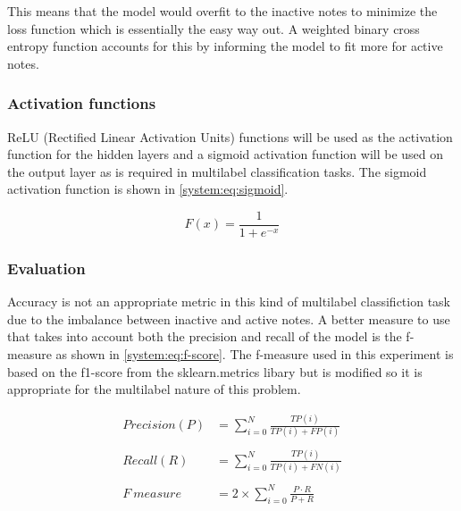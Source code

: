 This means that the model would overfit to the inactive notes to minimize the loss function which is essentially
the easy way out. A weighted binary cross entropy function accounts for this by
informing the model to fit more for active notes.

\subsubsection{Activation functions}

ReLU (Rectified Linear Activation Units) functions will be used as the
activation function for the hidden layers and a sigmoid activation function will
be used on the output layer as is required in multilabel classification tasks. The sigmoid
activation function is shown in \autoref{system:eq:sigmoid}.

\begin{equation}
    F (x) = \frac{1}{1+ e^{-x}}
    \label{system:eq:sigmoid}
\end{equation}

\subsubsection{Evaluation}
Accuracy is not an appropriate metric in this kind of multilabel classifiction task due to the
imbalance between inactive and active notes. A better measure to use that takes into account both the
precision and recall of the model is the f-measure as shown in \autoref{system:eq:f-score}. The f-measure used in this experiment is based on the
f1-score from the sklearn.metrics libary but is modified so it is appropriate for the
multilabel nature of this problem.

\begin{equation}
    \begin{aligned}
        Precision(P) & = \sum_{i=0}^{N}\frac{TP(i)}{TP(i) + FP(i)}   \\ \\
        Recall(R)    & = \sum_{i=0}^{N}\frac{TP(i)}{TP(i) + FN(i)}   \\ \\
        F~measure    & = 2 \times \sum_{i=0}^{N}\frac{P\cdot R}{P+R} \\
    \end{aligned}
    \label{system:eq:f-score}
\end{equation}